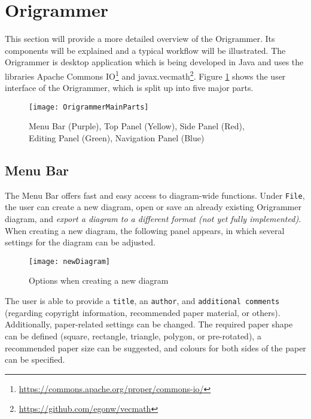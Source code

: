 
\section{Origrammer}
\label{sec:origrammer}

This section will provide a more detailed overview of the Origrammer. Its components will be explained and a typical workflow will be illustrated. The Origrammer is desktop application which is being developed in Java and uses the libraries Apache Commons IO\footnote{\url{https://commons.apache.org/proper/commons-io/}} and javax.vecmath\footnote{\url{https://github.com/egonw/vecmath}}. Figure \ref{fig:origrammerMain} shows the user interface of the Origrammer, which is split up into five major parts.

\begin{figure}[htbp]
	\centering
	\texttt{[image: OrigrammerMainParts]}
	\caption{Menu Bar (Purple), Top Panel (Yellow), Side Panel (Red),\\ Editing Panel (Green), Navigation Panel (Blue)}
	\label{fig:origrammerMain}
\end{figure}

\subsection{Menu Bar}

The Menu Bar offers fast and easy access to diagram-wide functions. Under \texttt{File}, the user can create a new diagram, open or save an already existing Origrammer diagram, and \emph{export a diagram to a different format (not yet fully implemented)}. When creating a new diagram, the following panel appears, in which several settings for the diagram can be adjusted.

\begin{figure}[htbp]
	\centering
	\texttt{[image: newDiagram]}
	\caption{Options when creating a new diagram}
	\label{fig:newDiagram}
\end{figure}

\noindent The user is able to provide a \texttt{title}, an \texttt{author}, and \texttt{additional comments} (regarding copyright information, recommended paper material, or others). Additionally, paper-related settings can be changed. The required paper shape can be defined (square, rectangle, triangle, polygon, or pre-rotated), a recommended paper size can be suggested, and colours for both sides of the paper can be specified.

